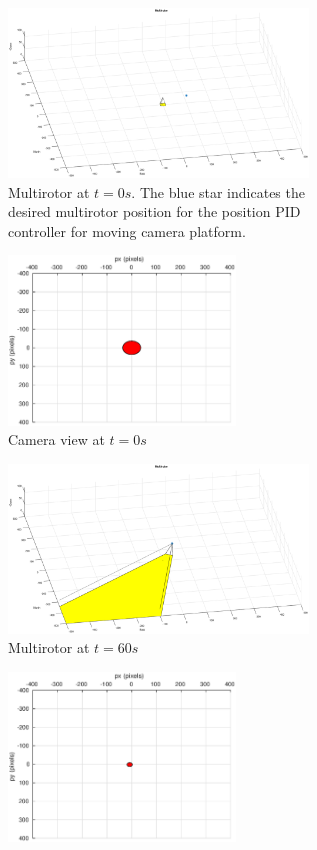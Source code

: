 \begin{figure}[htbp]
	\centering
	\begin{subfigure}{0.5\textwidth}
		\centering
		\includegraphics[height=4.5cm]{images/chapter2/uav_adaptive_0s}
		\caption{Multirotor at $t=0s$. The blue star indicates the desired multirotor position for the position PID controller for moving camera platform.}
	\end{subfigure}%
	\begin{subfigure}{0.5\textwidth}
		\centering
		\includegraphics[height=4.5cm]{images/chapter2/camera_adaptive_0s}
		\caption{Camera view at $t=0s$}
	\end{subfigure}
	\begin{subfigure}{0.5\textwidth}
		\centering
		\includegraphics[height=4.5cm]{images/chapter2/uav_adaptive_60s}
		\caption{Multirotor at $t=60s$}
	\end{subfigure}%
	\begin{subfigure}{0.5\textwidth}
		\centering
		\includegraphics[height=4.5cm]{images/chapter2/camera_adaptive_60s}

\end{subfigure}
\end{figure}

